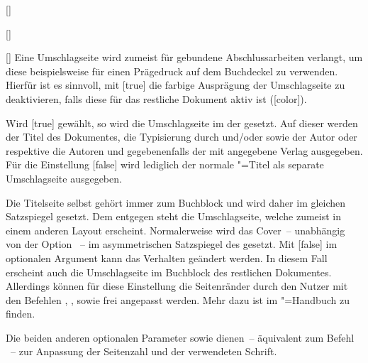 \begin{Declaration}{}
\begin{Declaration}{[\PBoolean]}
\begin{Declaration}[v2.02]{%
  []%
}
\begin{Declaration}{[\PSet]}
\printdeclarationlist%
%
Eine Umschlagseite wird zumeist für gebundene Abschlussarbeiten verlangt, um 
diese beispielsweise für einen Prägedruck auf dem Buchdeckel zu verwenden. 
Hierfür ist es sinnvoll, mit [true] die farbige Ausprägung der 
Umschlagseite zu deaktivieren, falls diese für das restliche Dokument aktiv ist 
([color]).

Wird [true] gewählt, so wird die Umschlagseite im \CD der 
\TnUD gesetzt. Auf dieser werden der Titel des Dokumentes, die Typisierung 
durch  und/oder  sowie der Autor oder respektive 
die Autoren und gegebenenfalls der mit  angegebene Verlag 
ausgegeben.
Für die Einstellung [false] wird lediglich der normale 
\KOMAScript"=Titel als separate Umschlagseite ausgegeben. 

Die Titelseite selbst gehört immer zum Buchblock und wird daher im gleichen 
Satzspiegel gesetzt. Dem entgegen steht die Umschlagseite, welche zumeist in 
einem anderen Layout erscheint. Normalerweise wird das Cover~-- unabhängig von 
der Option ~-- im asymmetrischen Satzspiegel des \CDs gesetzt. 
Mit [false] im optionalen Argument kann das 
Verhalten geändert werden. In diesem Fall erscheint auch die Umschlagseite im 
Buchblock des restlichen Dokumentes. Allerdings können für diese Einstellung 
die Seitenränder durch den Nutzer mit den Befehlen , 
,  sowie 
 frei angepasst werden. Mehr dazu ist im 
\KOMAScript"=Handbuch \scrguide zu finden.

Die beiden anderen optionalen Parameter  
sowie  dienen~-- äquivalent zum Befehl 
~-- zur Anpassung der Seitenzahl und der verwendeten Schrift.
\end{Declaration}
\end{Declaration}
\end{Declaration}
\end{Declaration}

